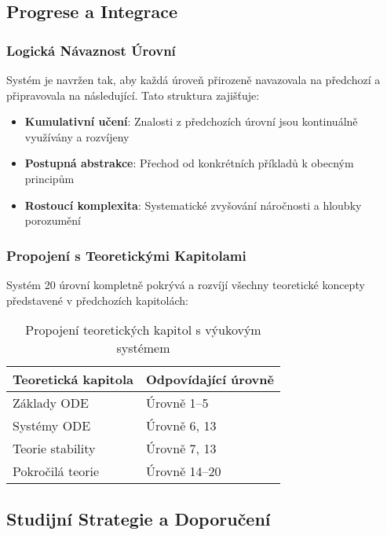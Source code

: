 \subsection{Progrese a Integrace}

\subsubsection{Logická Návaznost Úrovní}

Systém je navržen tak, aby každá úroveň přirozeně navazovala na předchozí a připravovala na následující. Tato struktura zajišťuje:

\begin{itemize}
\item \textbf{Kumulativní učení}: Znalosti z předchozích úrovní jsou kontinuálně využívány a rozvíjeny
\item \textbf{Postupná abstrakce}: Přechod od konkrétních příkladů k obecným principům
\item \textbf{Rostoucí komplexita}: Systematické zvyšování náročnosti a hloubky porozumění
\end{itemize}

\subsubsection{Propojení s Teoretickými Kapitolami}

Systém 20 úrovní kompletně pokrývá a rozvíjí všechny teoretické koncepty představené v předchozích kapitolách:

\begin{table}[ht]
\centering
\begin{tabular}{p{}p{}}
\toprule
\textbf{Teoretická kapitola} & \textbf{Odpovídající úrovně} \\
\midrule
Základy ODE & Úrovně 1–5 \\
Systémy ODE & Úrovně 6, 13 \\
Teorie stability & Úrovně 7, 13 \\
Pokročilá teorie & Úrovně 14–20 \\
\bottomrule
\end{tabular}
\caption{Propojení teoretických kapitol s výukovým systémem}
\label{tab:propojeni-kapitol}
\end{table}

\subsection{Studijní Strategie a Doporučení}

